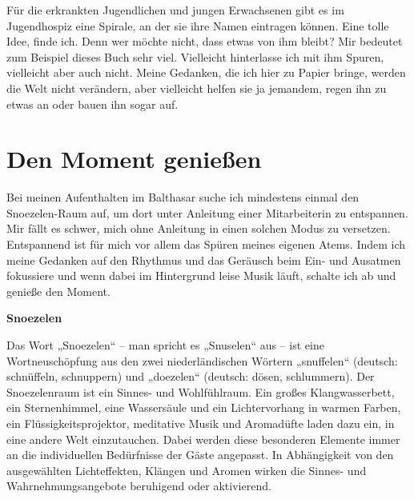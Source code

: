 \documentclass[fontsize=14pt,a4paper,headinclude,DIV=calc,automark]{scrbook}
\begin{document}
Für die erkrankten Jugendlichen und jungen Erwachsenen gibt es im Jugendhospiz eine Spirale, an der sie ihre Namen eintragen können. Eine tolle Idee, finde ich. Denn wer möchte nicht, dass etwas von ihm bleibt? Mir bedeutet zum Beispiel dieses Buch sehr viel. Vielleicht hinterlasse ich mit ihm Spuren, vielleicht aber auch nicht. Meine Gedanken, die ich hier zu Papier bringe, werden die Welt nicht verändern, aber vielleicht helfen sie ja jemandem, regen ihn zu etwas an oder bauen ihn sogar auf.

\section{Den Moment genießen}

Bei meinen Aufenthalten im Balthasar suche ich mindestens einmal den Snoezelen-Raum auf, um dort unter Anleitung einer Mitarbeiterin zu entspannen. Mir fällt es schwer, mich ohne Anleitung in einen solchen Modus zu versetzen. Entspannend ist für mich vor allem das Spüren meines eigenen Atems. Indem ich meine Gedanken auf den Rhythmus und das Geräusch beim Ein- und Ausatmen fokussiere und wenn dabei im Hintergrund leise Musik läuft, schalte ich ab und genieße den Moment.

\begin{tcolorbox}[
    enhanced,
    breakable,
    colframe=rahmenlinie,      %
    colback=white,             %
    left=12pt, right=12pt,     %
    top=12pt, bottom=12pt,     %
    boxrule=0.3pt,             %
    arc=8pt                    %
]
\small\sffamily
\setlength{\parindent}{0pt} %

\textbf{Snoezelen}

\vspace{0.5\baselineskip}

Das Wort „Snoezelen“ – man spricht es „Snuselen“ aus – ist eine Wortneuschöpfung aus den zwei niederländischen Wörtern „snuffelen“ (deutsch: schnüffeln, schnuppern) und „doezelen“ (deutsch: dösen, schlummern). Der Snoezelenraum ist ein Sinnes- und Wohlfühlraum. Ein großes Klangwasserbett, ein Sternenhimmel, eine Wassersäule und ein Lichtervorhang in warmen Farben, ein Flüssigkeitsprojektor, meditative Musik und Aromadüfte laden dazu ein, in eine andere Welt einzutauchen. Dabei werden diese besonderen Elemente immer an die individuellen Bedürfnisse der Gäste angepasst. In Abhängigkeit von den ausgewählten Lichteffekten, Klängen und Aromen wirken die Sinnes- und Wahrnehmungsangebote beruhigend oder aktivierend.

\end{tcolorbox}
\end{document}
